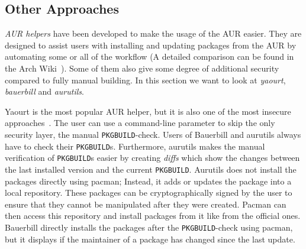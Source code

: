 \subsection{Other Approaches}
\emph{AUR helpers} have been developed to make the usage of the AUR easier.
They are designed to assist users with installing and updating packages from the AUR by automating some or all of the workflow (A detailed comparison can be found in the Arch Wiki~\cite{wiki:aur-helper}).
Some of them also give some degree of additional security compared to fully manual building.
In this section we want to look at \emph{yaourt}, \emph{bauerbill} and \emph{aurutils}.

Yaourt is the most popular AUR helper, but it is also one of the most insecure approaches~\cite{wiki:aur-helper}.
The user can use a command-line parameter to skip the only security layer, the manual \texttt{PKGBUILD}-check.
Users of Bauerbill and aurutils always have to check their \texttt{PKGBUILD}s.
Furthermore, aurutils makes the manual verification of \texttt{PKGBUILD}s easier by creating \emph{diffs} which show the changes between the last installed version and the current \texttt{PKGBUILD}.
Aurutils does not install the packages directly using pacman;
Instead, it adds or updates the package into a local repository.
These packages can be cryptographically signed by the user to ensure that they cannot be manipulated after they were created.
Pacman can then access this repository and install packages from it like from the official ones.
Bauerbill directly installs the packages after the \texttt{PKGBUILD}-check using pacman, but it displays if the maintainer of a package has changed since the last update.
